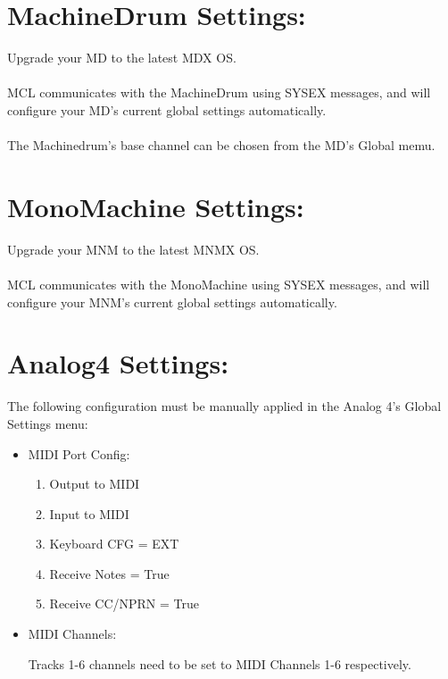 \section{MachineDrum Settings:}
Upgrade your MD to the latest MDX OS.\\\\
MCL communicates with the MachineDrum using SYSEX messages, and will configure your MD's current global settings automatically.
\\\\The Machinedrum's base channel can be chosen from the MD's Global memu.
\section{MonoMachine Settings:}
Upgrade your MNM to the latest MNMX OS.\\\\
MCL communicates with the MonoMachine using SYSEX messages, and will configure your MNM's current global settings automatically.
\section{Analog4 Settings:}

The following configuration must be manually applied in the Analog 4's Global Settings menu:

\begin{itemize}

\item{MIDI Port Config:}
\begin{enumerate}
\item{Output to MIDI}
\item{Input to MIDI}
\item{Keyboard CFG = EXT}
\item{Receive Notes = True}
\item{Receive CC/NPRN = True}
\end{enumerate}
\item{MIDI Channels:}

Tracks 1-6 channels need to be set to MIDI Channels 1-6 respectively.

\end{itemize}
